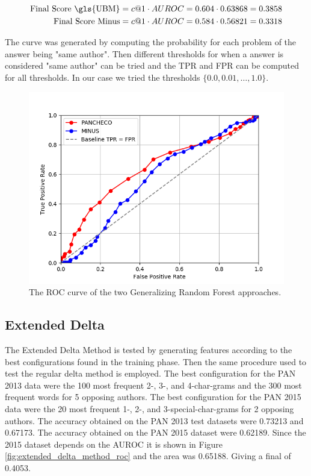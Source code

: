 \begin{align}
    \text{Final Score \gls{UBM}} &= c@1 \cdot AUROC = 0.604 \cdot 0.63868 = 0.3858  \\
    \text{Final Score Minus} &= c@1 \cdot AUROC = 0.584 \cdot 0.56821 = 0.3318
\end{align}

The curve was generated by computing the probability for each problem of the
answer being "same author". Then different thresholds for when a answer is
considered "same author" can be tried and the \gls{TPR} and \gls{FPR} can be
computed for all thresholds. In our case we tried the thresholds $\{0.0, 0.01,
\dots, 1.0\}$.

\begin{figure}
    \centering
    \includegraphics[width=.7\textwidth]{./pictures/forest_roc.png}
    \caption{The ROC curve of the two Generalizing Random Forest
    approaches.}
    \label{fig:forest_roc}
\end{figure}

\subsection{Extended Delta} \label{subsec:results:extended_delta}
The Extended Delta Method is tested by generating features according to the best
configurations found in the training phase. Then the same procedure used to test
the regular delta method is employed. The best configuration for the PAN 2013
data were the 100 most frequent 2-, 3-, and 4-char-grams and the 300 most
frequent words for 5 opposing authors. The best configuration for the PAN 2015
data were the 20 most frequent 1-, 2-, and 3-special-char-grams for 2 opposing
authors. The accuracy obtained on the PAN 2013 test datasets were 0.73213 and
0.67173. The accuracy obtained on the PAN 2015 dataset were 0.62189. Since the
2015 dataset depends on the \gls{AUROC} it is shown in Figure
\ref{fig:extended_delta_method_roc} and the area was 0.65188. Giving a final of
0.4053.

